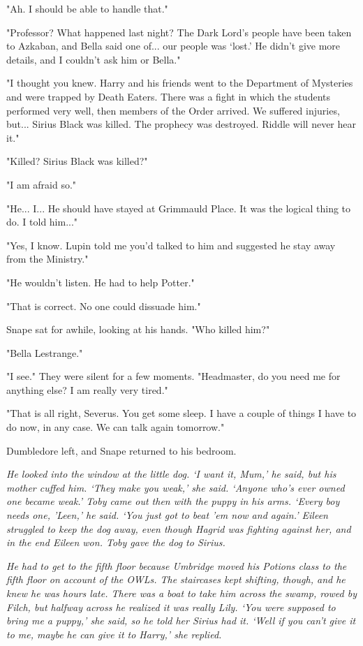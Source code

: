 "Ah. I should be able to handle that."

"Professor? What happened last night? The Dark Lord's people have been taken to Azkaban, and Bella said one of... our people was `lost.' He didn't give more details, and I couldn't ask him or Bella."

"I thought you knew. Harry and his friends went to the Department of Mysteries and were trapped by Death Eaters. There was a fight in which the students performed very well, then members of the Order arrived. We suffered injuries, but... Sirius Black was killed. The prophecy was destroyed. Riddle will never hear it."

"Killed? Sirius Black was killed?"

"I am afraid so."

"He... I... He should have stayed at Grimmauld Place. It was the logical thing to do. I told him..."

"Yes, I know. Lupin told me you'd talked to him and suggested he stay away from the Ministry."

"He wouldn't listen. He had to help Potter."

"That is correct. No one could dissuade him."

Snape sat for awhile, looking at his hands. "Who killed him?"

"Bella Lestrange."

"I see." They were silent for a few moments. "Headmaster, do you need me for anything else? I am really very tired."

"That is all right, Severus. You get some sleep. I have a couple of things I have to do now, in any case. We can talk again tomorrow."

Dumbledore left, and Snape returned to his bedroom.

\sbreak

\emph{He looked into the window at the little dog. `I want it, Mum,' he said, but his mother cuffed him. `They make you weak,' she said. `Anyone who's ever owned one became weak.' Toby came out then with the puppy in his arms. `Every boy needs one, 'Leen,' he said. `You just got to beat 'em now and again.' Eileen struggled to keep the dog away, even though Hagrid was fighting against her, and in the end Eileen won. Toby gave the dog to Sirius.}

\emph{He had to get to the fifth floor because Umbridge moved his Potions class to the fifth floor on account of the OWLs. The staircases kept shifting, though, and he knew he was hours late. There was a boat to take him across the swamp, rowed by Filch, but halfway across he realized it was really Lily. `You were supposed to bring me a puppy,' she said, so he told her Sirius had it. `Well if you can't give it to me, maybe he can give it to Harry,' she replied.}

